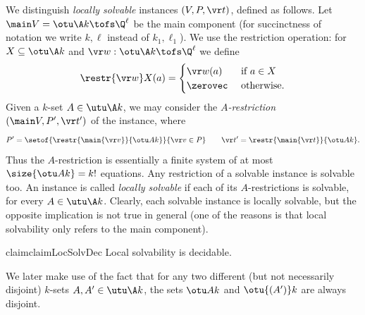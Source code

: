 We distinguish \emph{locally solvable} instances $(V, P, \vr t)$, defined as follows.
Let $\main V = \otu \A k \tofs \Q^\ell$ be the main component (for succinctness of notation  
we write $k, \ell$ instead of $k_1, \ell_1$).
We use the restriction operation: for $X\subseteq \otu \A k$ and $\vr w : \otu \A k \tofs \Q^\ell$ we define
\[
\restr {\vr w} X(a) = \begin{cases}
\vr w(a) & \text{ if } a \in X\\
\zerovec & \text{ otherwise.}
\end{cases}
\]
Given a $k$-set $A\in\utu \A k$,  we may consider the \emph{$A$-restriction} 
$(\main V, P', \vr t')$
of the instance, where
\[
P' = \setof{\restr{\main{\vr v}} {\otu A k}}{\vr v \in P} \qquad
\vr t' = \restr{\main{\vr t}} {\otu A k}.
\]
Thus the $A$-restriction is essentially a finite system of at most $\size{\otu A k} = k!$ equations.
Any restriction of a solvable instance is solvable too.
An instance is called \emph{locally solvable} if each of its $A$-restrictions is solvable, for every 
$A\in \utu \A k$.
Clearly, each solvable instance is locally solvable, but the opposite implication is not true in general
(one of the reasons is that local solvability only refers to the main component).

\begin{restatable}{claim}{claimLocSolvDec}
\label{claim:loc-solv-dec}
Local solvability is decidable. 
\end{restatable}
%


We later make use of the fact that for any two different (but not necessarily disjoint) $k$-sets
$A, A'\in\utu \A k$, the sets
$\otu A k$ and $\otu {(A')} k$ are always disjoint.

